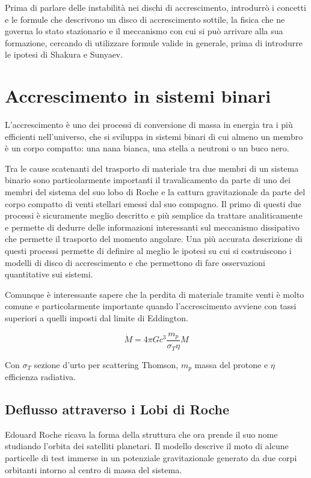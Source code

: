 \documentclass[a4paperbi]{article}
\begin{document}
	Prima di parlare delle instabilità nei dischi di accrescimento, introdurrò i concetti e le formule che descrivono un disco di accrescimento sottile, la fisica che ne governa lo stato stazionario e il meccanismo con cui si può arrivare alla sua formazione, cercando di utilizzare formule valide in generale, prima di introdurre le ipotesi di Shakura e Sunyaev.
	
\newpage
\section{Accrescimento in sistemi binari}
	L'accrescimento è uno dei processi di conversione di massa in energia tra i più efficienti nell'universo, che si sviluppa in sistemi binari di cui almeno un membro è un corpo compatto: una nana bianca, una stella a neutroni o un buco nero.

	Tra le cause scatenanti del trasporto di materiale tra due membri di un sistema binario sono particolarmente importanti il travalicamento da parte di uno dei membri del sistema del suo lobo di Roche e la cattura gravitazionale da parte del corpo compatto di venti stellari emessi dal suo compagno. Il primo di questi due processi è sicuramente meglio descritto e più semplice da trattare analiticamente e permette di dedurre delle informazioni interessanti sul meccanismo dissipativo che permette il trasporto del momento angolare. Una più accurata descrizione di questi processi permette di definire al meglio le ipotesi su cui si costruiscono i modelli di disco di accrescimento e che permettono di fare osservazioni quantitative sui sistemi.
	
	Comunque è interessante sapere che la perdita di materiale tramite venti è molto comune e particolarmente importante quando l'accrescimento avviene con tassi superiori a quelli imposti dal limite di Eddington.
	
	\begin{equation}
		\dot{M}=4\pi Gc^3\frac{m_p}{\sigma_T \eta}M
	\end{equation}
	
	Con $\sigma_T$ sezione d'urto per scattering Thomson, $m_p$ massa del protone e $\eta$ efficienza radiativa.

\subsection{Deflusso attraverso i Lobi di Roche}
	Edouard Roche ricava la forma della struttura che ora prende il suo nome studiando l'orbita dei satelliti planetari. Il modello descrive il moto di alcune particelle di test immerse in un potenziale gravitazionale generato da due corpi orbitanti intorno al centro di massa del sistema.
	
\end{document}

